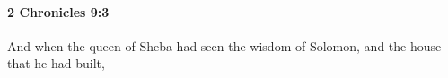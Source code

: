 
		\paragraph{2 Chronicles 9:3} %
			\label{2CHRONICLES-9-3}

			And when the queen of Sheba had seen the wisdom of Solomon, and the house that he had built,


